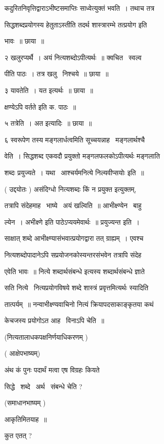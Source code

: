 \documentclass[11pt, openany]{book}
\begin{document}
कदुरितनिवृत्तिद्वाराऽभीष्टसमाप्तिः साध्वेत्युक्तं भवति~। तथाच तत्र 

सिद्धशब्दप्रयोगस्य हेतुताऽस्तीति तदर्थ शास्त्रारम्भे तत्प्रयोग इति 

भावः~॥ छाया~॥ 

२ खलुरप्यर्थै~। अयं नित्यशब्दोऽपीत्यर्थः~॥ क्वचित \textendash\ स्वल्व \textendash\ 

पीति पाठः~। तत्र खलु \textendash\ निश्चये~॥ छाया~॥ 

३ यावतेति~। यत इत्यर्थः~॥ छाया~॥ 

{\qt क्षण्येऽपि वर्तते} इति क. पाठः~॥ 

५ तत्रेति~। अत इत्यादिः~॥ छाया~॥ 

६ स्वरूपेण तस्य मङ्गलार्धत्वमिति सूच्चयन्नाह \textendash\ मङ्गलार्थश्चै \textendash\ 

वेति~। सिद्धशब्द एकवदौ प्रयुक्तो मङ्गलफलकोऽपीत्यर्थः मङ्गलाति 



शब्दः प्रयुज्यते~। यथा \textendash\ {\qt आश्चर्यमनित्ये निल्यवीप्सयोः} इति~॥ 

( उद्दयोतः ) असंदिग्धो नित्यशब्दः किं न प्रयुक्त इत्युक्तम्, 

तत्रापि संदेहमाह \textendash\ भाष्ये \textendash\ अयं खल्विति~॥ आभीक्ष्ण्येन \textendash\ बाहु \textendash\ 

ल्येन~। {\qt अभीक्ष्णे} इति पाठेऽप्ययमेवार्थः~॥ प्रयुज्यन्त इति~। 

साक्षात् शब्दे आभीक्ष्ण्यासंभवात्प्रयोगद्वारा तत् ग्राह्यम्~। एवश्च 

नित्यशब्दोपादानेऽपि सप्रयोजनकोस्यन्तरसंभवेन तत्रापि संदेह 

एवेति भावः~॥ {\qt नित्ये शब्दार्थसंबन्धे} इत्यस्य शब्दार्थसंबन्धे ज्ञाते 

सति नित्ये \textendash\ नित्यप्रयोगविषये शब्दे शास्त्रं प्रवृत्तमित्यर्थः स्यादिति 

तात्पर्यम्~॥ नन्वाभीक्ष्ण्यवाचिनो नित्यं क्रियापदसाकाङ्कृतया कथं 

केचजस्य प्रयोगोऽत आह \textendash\ विनाऽपि चेति~॥ 

(नित्यतालाधकपक्षनिर्णयाधिकरणम् ) 

( आक्षेपभाष्यम्) 

अंथ कं पुनः पदार्थं मत्वा एष विग्रहः कियते \textendash\ 

सिद्धे \textendash\ शब्दे \textendash\ अर्थ \textendash\ संबन्धे चेति ? 

(समाधानभाष्यम् ) 

आकृतिमितयाह~॥ 

कुत एतत् ?
\end{document}
